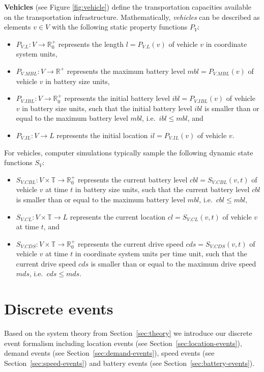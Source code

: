 \documentclass[graybox]{svmult}
\begin{document}
\noindent \textbf{Vehicles} (see Figure \ref{fig:vehicle})  define the transportation capacities available on the transportation infrastructure.
Mathematically, \textit{vehicles} can be described as elements $v \in V$ with the following static property functions $P_{V}$:
\begin{itemize}
	\item $P_{V.L}: V \rightarrow \mathbb{R}_0^+$ represents the length $l = P_{V.L}(v)$ of vehicle $v$ in coordinate system units,
	\item $P_{V.MBL}: V \rightarrow \mathbb{R}^+$ represents the maximum battery level $mbl = P_{V.MBL}(v)$ of vehicle $v$ in battery size units,
	\item $P_{V.IBL}: V \rightarrow \mathbb{R}_0^+$ represents the initial battery level $ibl = P_{V.IBL}(v)$ of vehicle $v$ in battery size units, such that the initial battery level $ibl$ is smaller than or equal to the maximum battery level $mbl$, i.e.\ $ibl \leq mbl$, and
	\item $P_{V.IL}: V \rightarrow L$ represents the initial location $il = P_{V.IL}(v)$ of vehicle $v$.
\end{itemize}
For vehicles, computer simulations typically sample the following dynamic state functions $S_{V}$:
\begin{itemize}
	\item $S_{V.CBL}: V \times \mathbb{T} \rightarrow \mathbb{R}_0^+$ represents the current battery level $cbl = S_{V.CBL}(v, t)$ of vehicle $v$ at time $t$ in battery size units, such that the current battery level $cbl$ is smaller than or equal to the maximum battery level $mbl$, i.e.\ $cbl \leq mbl$,
	\item $S_{V.CL}: V \times \mathbb{T} \rightarrow L$ represents the current location $cl = S_{V.CL}(v, t)$ of vehicle $v$ at time $t$, and
	\item $S_{V.CDS}: V \times \mathbb{T} \rightarrow \mathbb{R}_0^+$ represents the current drive speed $cds = S_{V.CDS}(v, t)$ of vehicle $v$ at time $t$ in coordinate system units per time unit, such that the current drive speed $cds$ is smaller than or equal to the maximum drive speed $mds$, i.e.\ $cds \leq mds$.
\end{itemize}

\section{Discrete events}
\label{sec:events}

Based on the system theory from Section~\ref{sec:theory} we introduce our discrete event formalism including location events (see Section~\ref{sec:location-events}), demand events (see Section~\ref{sec:demand-events}), speed events (see Section~\ref{sec:speed-events}) and battery events (see Section~\ref{sec:battery-events}).
\end{document}
